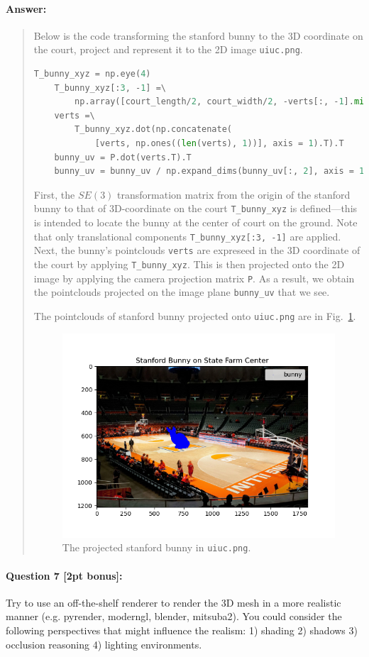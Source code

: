 \documentclass[11pt]{article}
\begin{document}
\paragraph{Answer:} 
\begin{quote}
    Below is the code transforming the stanford bunny to the 3D coordinate on the court, project and represent it to the 2D image \texttt{uiuc.png}.
    \begin{lstlisting}[language=Python]
    T_bunny_xyz = np.eye(4)
    T_bunny_xyz[:3, -1] =\
        np.array([court_length/2, court_width/2, -verts[:, -1].min()])
    verts =\
        T_bunny_xyz.dot(np.concatenate(
            [verts, np.ones((len(verts), 1))], axis = 1).T).T
    bunny_uv = P.dot(verts.T).T
    bunny_uv = bunny_uv / np.expand_dims(bunny_uv[:, 2], axis = 1)
    \end{lstlisting}
    
    First, the $SE(3)$ transformation matrix from the origin of the stanford bunny to that of 3D-coordinate on the court \verb|T_bunny_xyz| is defined---this is intended to locate the bunny at the center of court on the ground. Note that only translational components \verb|T_bunny_xyz[:3, -1]| are applied. Next, the bunny's pointclouds \verb|verts| are expreseed in the 3D coordinate of the court by applying \verb|T_bunny_xyz|. This is then projected onto the 2D image by applying the camera projection matrix \verb|P|. As a result, we obtain the pointclouds projected on the image plane \verb|bunny_uv| that we see.

    The pointclouds of stanford bunny projected onto \texttt{uiuc.png} are in Fig.~\ref{fig:projection_bunny}.
    \begin{figure}[h]
        \centering
        \includegraphics[width=0.7\linewidth]{../mp1/imgs/Q6.png}
        \caption{The projected stanford bunny in \texttt{uiuc.png}.}
        \label{fig:projection_bunny}
    \end{figure}
\end{quote}

\paragraph{Question 7 [2pt bonus]:} Try to use an off-the-shelf renderer to render the 3D mesh in a more realistic manner (e.g. pyrender, moderngl, blender, mitsuba2). You could consider the following perspectives that might influence the realism: 1) shading 2) shadows 3) occlusion reasoning 4) lighting environments. 
\end{document}
